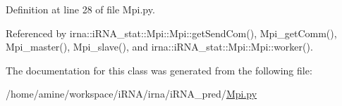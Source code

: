 \-Definition at line 28 of file \-Mpi.\-py.



\-Referenced by irna\-::i\-R\-N\-A\-\_\-stat\-::\-Mpi\-::\-Mpi\-::get\-Send\-Com(), \-Mpi\-\_\-get\-Comm(), \-Mpi\-\_\-master(), \-Mpi\-\_\-slave(), and irna\-::i\-R\-N\-A\-\_\-stat\-::\-Mpi\-::\-Mpi\-::worker().



\-The documentation for this class was generated from the following file\-:\begin{DoxyCompactItemize}
\item 
/home/amine/workspace/i\-R\-N\-A/irna/i\-R\-N\-A\-\_\-pred/\hyperlink{iRNA__pred_2Mpi_8py}{\-Mpi.\-py}\end{DoxyCompactItemize}
